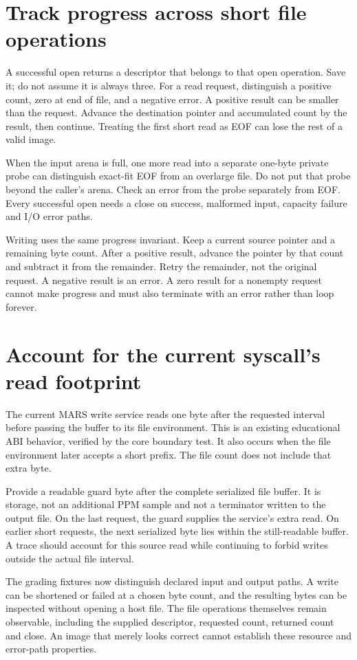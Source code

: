 \section{Track progress across short file operations}
A successful open returns a descriptor that belongs to that open operation. Save it;
do not assume it is always three. For a read request, distinguish a positive count,
zero at end of file, and a negative error. A positive result can be smaller than the
request. Advance the destination pointer and accumulated count by the result, then
continue. Treating the first short read as EOF can lose the rest of a valid image.

When the input arena is full, one more read into a separate one-byte private probe can
distinguish exact-fit EOF from an overlarge file. Do not put that probe beyond the
caller's arena. Check an error from the probe separately from EOF. Every successful
open needs a close on success, malformed input, capacity failure and I/O error paths.

Writing uses the same progress invariant. Keep a current source pointer and a remaining
byte count. After a positive result, advance the pointer by that count and subtract it
from the remainder. Retry the remainder, not the original request. A negative result
is an error. A zero result for a nonempty request cannot make progress and must also
terminate with an error rather than loop forever.

\section{Account for the current syscall's read footprint}
The current MARS write service reads one byte after the requested interval before passing
the buffer to its file environment. This is an existing educational ABI behavior, verified
by the core boundary test. It also occurs when the file environment later accepts a
short prefix. The file count does not include that extra byte.

Provide a readable guard byte after the complete serialized file buffer. It is storage,
not an additional PPM sample and not a terminator written to the output file. On the
last request, the guard supplies the service's extra read. On earlier short requests,
the next serialized byte lies within the still-readable buffer. A trace should account
for this source read while continuing to forbid writes outside the actual file interval.

The grading fixtures now distinguish declared input and output paths. A write can be
shortened or failed at a chosen byte count, and the resulting bytes can be inspected
without opening a host file. The file operations themselves remain observable, including
the supplied descriptor, requested count, returned count and close. An image that merely
looks correct cannot establish these resource and error-path properties.
